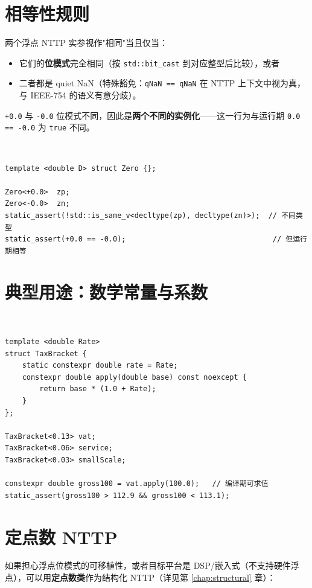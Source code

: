 \documentclass[12pt,a4paper,fontset=fandol]{ctexbook}
\newcommand{\cpplabel}{%
  \tcbox[on line,colback=cppheadbg,colframe=cppheadbg,
    boxrule=0pt,arc=1pt,left=2pt,right=2pt,top=1pt,bottom=1pt,
    colupper=white,fontupper=\scriptsize\bfseries]{C++}}
\newcommand{\cppxxlabel}[1]{%
  \tcbox[on line,colback=cpp20bg,colframe=cpp20bg,
    boxrule=0pt,arc=1pt,left=2pt,right=2pt,top=1pt,bottom=1pt,
    colupper=white,fontupper=\scriptsize\bfseries]{#1}}
\newcommand{\kw}[1]{\texttt{#1}}
\begin{document}
\section{相等性规则}

两个浮点 NTTP 实参视作"相同"当且仅当：

\begin{itemize}
  \item 它们的\textbf{位模式}完全相同（按 \kw{std::bit\_cast} 到对应整型后比较），或者
  \item 二者都是 quiet NaN（特殊豁免：\kw{qNaN == qNaN} 在 NTTP 上下文中视为真，与 IEEE-754 的语义有意分歧）。
\end{itemize}

\kw{+0.0} 与 \kw{-0.0} 位模式不同，因此是\textbf{两个不同的实例化}——这一行为与运行期 \kw{0.0 == -0.0} 为 \kw{true} 不同。

\cpplabel\ \begin{lstlisting}
template <double D> struct Zero {};

Zero<+0.0>  zp;
Zero<-0.0>  zn;
static_assert(!std::is_same_v<decltype(zp), decltype(zn)>);  // 不同类型
static_assert(+0.0 == -0.0);                                  // 但运行期相等
\end{lstlisting}

\section{典型用途：数学常量与系数}

\cppxxlabel{C++20}\ \begin{lstlisting}
template <double Rate>
struct TaxBracket {
    static constexpr double rate = Rate;
    constexpr double apply(double base) const noexcept {
        return base * (1.0 + Rate);
    }
};

TaxBracket<0.13> vat;
TaxBracket<0.06> service;
TaxBracket<0.03> smallScale;

constexpr double gross100 = vat.apply(100.0);   // 编译期可求值
static_assert(gross100 > 112.9 && gross100 < 113.1);
\end{lstlisting}

\section{定点数 NTTP}

如果担心浮点位模式的可移植性，或者目标平台是 DSP/嵌入式（不支持硬件浮点），可以用\textbf{定点数类}作为结构化 NTTP（详见第 \ref{chap:structural} 章）：
\end{document}
